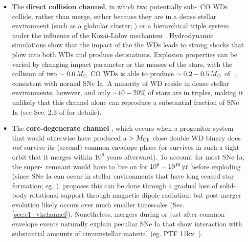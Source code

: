 \begin{itemize}
	\item The {\bf direct collision channel}, in which two potentially sub-\Mch\ CO WDs collide, rather than merge, either because they are in a dense stellar environment (such as a globular cluster; \citealt{benzth89, loreig10}) or a hierarchical triple system \citep{katzd12} under the influence of the Kozai-Lidov mechanism \citep{koza62, lido62}.  Hydrodynamic simulations \citep{rask+10, kush+13, garc+13} show that the impact of the the WDs leads to strong shocks that plow into both WDs and produce detonations.  Explosion properties can be varied by changing impact parameter or the masses of the stars, with the collision of two $\sim0.6\,\Msun$ CO WDs is able to produce $\sim0.2-0.5\,\Msun$ of \Ni\ \citep{garc+13, kush+13}, consistent with normal SNe Ia.  A minority of WD reside in dense stellar environments, however, and only $\sim10-20$\% of stars are in triples, making it unlikely that this channel alone can reproduce a substantial fraction of SNe Ia (see Sec. 2.3 of \citealt{maozmn14} for details).

	\item The {\bf core-degenerate channel} \citep{livir03, kashs11, tsebs15}, which occurs when a progenitor system that would otherwise have produced a $>\Mch$ close double WD binary does \textit{not} survive its (second) common envelope phase (or survives in such a tight orbit that it merges within $10^6$ years afterward).  To account for most SNe Ia, the super-\Mch\ remnant would have to live on for $10^{8}-10^{10}\,\mathrm{yr}$ before exploding (since SNe Ia can occur in stellar environments that have long ceased star formation; eg. \citealt{prichs08, maozsg10}).  \cite{illks12} proposes this can be done through a gradual loss of solid-body rotational support through magnetic dipole radiation, but post-merger evolution likely occurs over much smaller timescales (Sec. \ref{sec:c1_vkchannel}).  Nonetheless, mergers during or just after common-envelope events naturally explain peculiar SNe Ia that show interaction with substantial amounts of circumstellar material (eg. PTF 11kx; \citealt{dild+12, soke13}).

\end{itemize}


